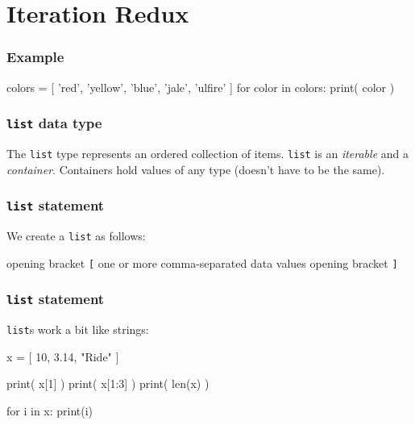 \documentclass[11pt]{beamer}
\begin{document}
\section{Iteration Redux}

\begin{frame}[fragile]
  \frametitle{Example}
  \Enlarge

  \begin{semiverbatim}
colors = [ 'red', 'yellow', 'blue', 'jale', 'ulfire' ]
for color in colors:
    print( color )
  \end{semiverbatim}
\end{frame}

\begin{frame}[fragile]
  \frametitle{\texttt{list} data type}
  \Enlarge

  \begin{itemize}
  \myitem  The \texttt{list} type represents an ordered collection of items.
  \myitem  \texttt{list} is an \emph{iterable} and a \emph{container}.
  \myitem  Containers hold values of any type (doesn't have to be the same).
  \end{itemize}
\end{frame}

\begin{frame}[fragile]
  \frametitle{\texttt{list} statement}
  \Enlarge

  \begin{itemize}
  \myitem  We create a \texttt{list} as follows:
    \begin{itemize}
    \mysubitem  opening bracket \texttt{[}
    \mysubitem  one or more comma-separated data values
    \mysubitem  opening bracket \texttt{]}
    \end{itemize}
  \end{itemize}
\end{frame}

\begin{frame}[fragile]
  \frametitle{\texttt{list} statement}
  \Enlarge

  \begin{itemize}
  \myitem  \texttt{list}s work a bit like strings:
    \begin{semiverbatim}
x = [ 10, 3.14, "Ride" ]

print( x[1] )
print( x[1:3] )
print( len(x) )

for i in x:
    print(i)
    \end{semiverbatim}
  \end{itemize}
\end{frame}
\end{document}
